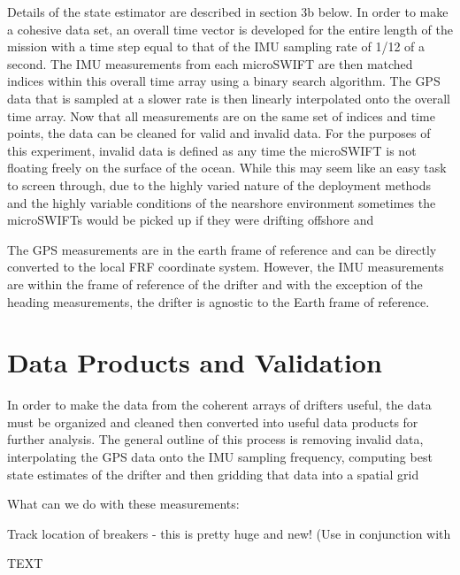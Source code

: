 \documentclass[essd, manuscript]{copernicus}
\begin{document}
Details of the state estimator are described in section 3b below.  In order to make a cohesive data set, an overall time vector is developed for the entire length of the mission with a time step equal to that of the IMU sampling rate of 1/12 of a second. The IMU measurements from each microSWIFT are then matched indices within this overall time array using a binary search algorithm. The GPS data that is sampled at a slower rate is then linearly interpolated onto the overall time array. Now that all measurements are on the same set of indices and time points, the data can be cleaned for valid and invalid data. For the purposes of this experiment, invalid data is defined as any time the microSWIFT is not floating freely on the surface of the ocean. While this may seem like an easy task to screen through, due to the highly varied nature of the deployment methods and the highly variable conditions of the nearshore environment sometimes the microSWIFTs would be picked up if they were drifting offshore and 


The GPS measurements are in the earth frame of reference and can be directly converted to the local FRF coordinate system. However, the IMU measurements are within the frame of reference of the drifter and with the exception of the heading measurements, the drifter is agnostic to the Earth frame of reference. 

\section{Data Products and Validation}
In order to make the data from the coherent arrays of drifters useful, the data must be organized and cleaned then converted into useful data products for further analysis. The general outline of this process is removing invalid data, interpolating the GPS data onto the IMU sampling frequency, computing best state estimates of the drifter and then gridding that data into a spatial grid

What can we do with these measurements:
\begin{list}
    \item Track location of breakers - this is pretty huge and new! (Use in conjunction with 
\end{list}

\conclusions  %
TEXT

\end{document}
